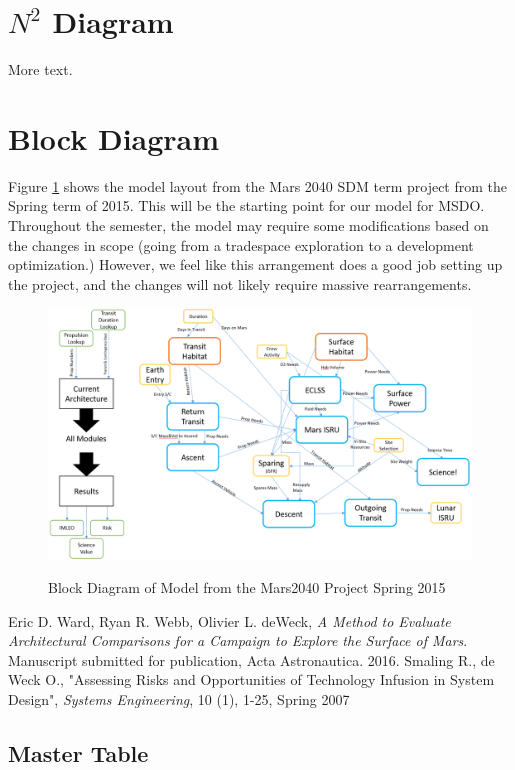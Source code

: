 \documentclass[11pt]{article} %
\begin{document}
\clearpage
\section{$N^2$ Diagram}

More text.

\section{Block Diagram}
Figure \ref{fig:m2040block} shows the model layout from the Mars 2040 SDM term project from the Spring term of 2015.  This will be the starting point for our model for MSDO.  Throughout the semester, the model may require some modifications based on the changes in scope (going from a tradespace exploration to a development optimization.) However, we feel like this arrangement does a good job setting up the project, and the changes will not likely require massive rearrangements.
\begin{figure}
\includegraphics[width=\textwidth]{M2040Block}
\label{fig:m2040block}
\caption{Block Diagram of Model from the Mars2040 Project Spring 2015}
\end{figure}

\clearpage
\begin{thebibliography}{1}
 Eric D. Ward, Ryan R. Webb, Olivier L. deWeck, {\em A Method to Evaluate Architectural Comparisons for a Campaign to Explore the Surface of Mars}. Manuscript submitted for publication, Acta Astronautica. 2016.
Smaling R., de Weck O., "Assessing Risks and Opportunities of Technology Infusion in System Design", {\em Systems Engineering}, 10 (1), 1-25, Spring 2007
\end{thebibliography}

\clearpage
\begin{appendices}
\section{Master Table}

\end{appendices}
\end{document}
